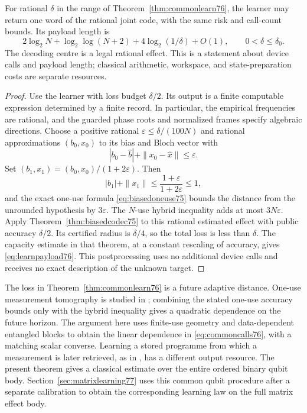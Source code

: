 \begin{corollary}
\label{cor:learncode76}
For rational $\delta$ in the range of
Theorem~\ref{thm:commonlearn76}, the learner may return one word of
the rational joint code, with the same risk and call-count bounds.
Its payload length is
\begin{equation}\label{eq:learnpayload76}
 2\log_2N+\log_2\log(N+2)
             +4\log_2(1/\delta)+O(1),
 \qquad 0<\delta\le\delta_0.
\end{equation}
The decoding centre is a legal rational effect.  This is a statement
about device calls and payload length; classical arithmetic,
workspace, and state-preparation costs are separate resources.
\end{corollary}
\begin{proof}
Use the learner with loss budget $\delta/2$.  Its output is a finite
computable expression determined by a finite record.  In particular,
the empirical frequencies are rational, and the guarded phase roots
and normalized frames specify algebraic directions.  Choose a
positive rational $\varepsilon\le\delta/(100N)$ and rational
approximations $(b_0,x_0)$ to its bias and Bloch vector with
\[
 |b_0-\widehat b|+\|x_0-\widehat x\|\le\varepsilon.
\]
Set $(b_1,x_1)=(b_0,x_0)/(1+2\varepsilon)$.  Then
\[
 |b_1|+\|x_1\|
       \le\frac{1+\varepsilon}{1+2\varepsilon}\le1,
\]
and the exact one-use formula \eqref{eq:biasedoneuse75} bounds the
distance from the unrounded hypothesis by $3\varepsilon$.
The $N$-use hybrid inequality adds at most $3N\varepsilon$.
Apply Theorem~\ref{thm:biasedcodec75} to this rational estimated
effect with public accuracy $\delta/2$.  Its certified radius is
$\delta/4$, so the total loss is less than $\delta$.
The capacity estimate in that theorem, at a constant rescaling of
accuracy, gives \eqref{eq:learnpayload76}.  This postprocessing uses
no additional device calls and receives no exact description of the
unknown target.
\end{proof}

The loss in Theorem~\ref{thm:commonlearn76} is a future adaptive
distance.  One-use measurement tomography is studied in
\cite{MB67,ZRK76}; combining the stated one-use accuracy bounds
only with the hybrid inequality gives a quadratic dependence on
the future horizon.  The argument here uses finite-use geometry
and data-dependent entangled blocks to obtain the linear dependence
in \eqref{eq:commoncalls76}, with a matching scalar converse.
Learning a stored programme from which a measurement is later
retrieved, as in \cite{BDPS76}, has a different output resource.
The present theorem gives a classical estimate over the entire
ordered binary qubit body.  Section~\ref{sec:matrixlearning77} uses
this common qubit procedure after a separate calibration to obtain
the corresponding learning law on the full matrix effect body.
